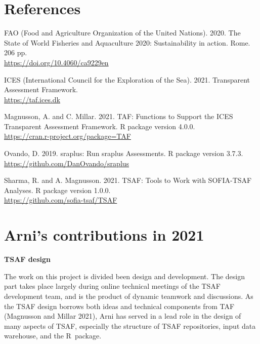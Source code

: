 \documentclass[12pt]{article}
\newcommand\blue[1]{\textcolor{darkblue}{#1}}
\begin{document}
\section{References}

\small\sloppy\setlength{}\selectfont
\begin{description}\setlength\itemsep{0.5ex}\vspace{0.5ex}

  \item FAO (Food and Agriculture Organization of the United Nations). 2020. The
  State of World Fisheries and Aquaculture 2020: Sustainability in action. Rome.
  206 pp.\\
  \blue{\footnotesize\url{https://doi.org/10.4060/ca9229en}}

  \item ICES (International Council for the Exploration of the Sea). 2021.
  Transparent Assessment Framework.\\
  \blue{\footnotesize\url{https://taf.ices.dk}}

  \item Magnusson, A. and C. Millar. 2021. TAF: Functions to Support the ICES
  Transparent Assessment Framework. R package version 4.0.0.\\
  \blue{\footnotesize\url{https://cran.r-project.org/package=TAF}}

  \item Ovando, D. 2019. sraplus: Run sraplus Assessments. R package version
  3.7.3.\\
  \blue{\footnotesize\url{https://github.com/DanOvando/sraplus}}

  \item Sharma, R. and A. Magnusson. 2021. TSAF: Tools to Work with SOFIA-TSAF
  Analyses. R package version 1.0.0.\\
  \blue{\footnotesize\url{https://github.com/sofia-tsaf/TSAF}}

\end{description}

\normalsize

\newpage

\appendix

\section{Arni's contributions in 2021}

\textbf{TSAF design}

The work on this project is divided been design and development. The design part
takes place largely during online technical meetings of the TSAF development
team, and is the product of dynamic teamwork and discussions. As the TSAF design
borrows both ideas and technical components from TAF (Magnusson and Millar
2021), Arni has served in a lead role in the design of many aspects of TSAF,
especially the structure of TSAF repositories, input data warehouse, and the
R~package.\\[-2ex]
\end{document}
